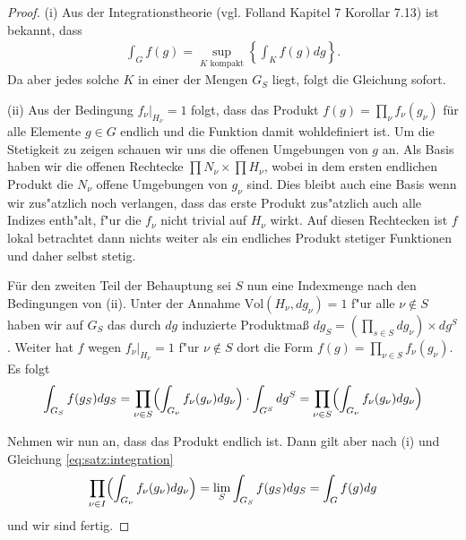 		\begin{proof}
			(i) Aus der Integrationstheorie (vgl. Folland \cite{folland} Kapitel 7 Korollar 7.13) ist bekannt, dass 
			\begin{align*}
				\int_{G} f(g) = \sup_{K \text{ kompakt}} \left\{ \int_{K} f(g)dg \right\}.
			\end{align*}
			Da aber jedes solche $K$ in einer der Mengen $G_S$ liegt, folgt die Gleichung sofort.
			
			(ii) Aus der Bedingung $f_\nu |_{H_\nu} = 1$ folgt, dass das Produkt $f(g) = \prod_{\nu}f_{\nu}(g_\nu)$ für alle Elemente $g \in G$ endlich und die Funktion damit wohldefiniert ist. 
			Um die Stetigkeit zu zeigen schauen wir uns die offenen Umgebungen von $g$ an.
			Als Basis haben wir die offenen Rechtecke $\prod N_\nu \times \prod H_\nu$, wobei in dem ersten endlichen Produkt die $N_\nu$ offene Umgebungen von $g_\nu$ sind.  
			Dies bleibt auch eine Basis wenn wir zus"atzlich noch verlangen, dass das erste Produkt zus"atzlich auch alle Indizes enth"alt, f"ur die $f_\nu$ nicht trivial auf $H_\nu$ wirkt.
			Auf diesen Rechtecken ist $f$ lokal betrachtet dann nichts weiter als ein endliches Produkt stetiger Funktionen und daher selbst stetig.
			
			Für den zweiten Teil der Behauptung sei $S$ nun eine Indexmenge nach den Bedingungen von (ii). 
			Unter der Annahme $\text{Vol}(H_\nu, dg_\nu) = 1$ f"ur alle $\nu \notin S$ haben wir auf $G_S$ das durch $dg$ induzierte Produktmaß $dg_S =\left(\prod_{s \in S}dg_\nu\right) \times dg^S$.
			Weiter hat $f$ wegen $f_\nu|_{H_\nu} = 1$ f"ur $\nu \notin S$ dort die Form $f(g) = \prod_{\nu\in S}f_\nu(g_\nu)$. 
			Es folgt
			\begin{align*}
				\int_{G_S} f(g_S) dg_S = \prod_{\nu\in S}\Bigl(\int_{G_\nu} f_\nu (g_\nu)dg_\nu\Bigr) \cdot \int_{G^S} dg^S = \prod_{\nu\in S}\Bigl(\int_{G_\nu} f_\nu (g_\nu)dg_\nu\Bigr)
			\end{align*}
			
			Nehmen wir nun an, dass das Produkt endlich ist. 
			Dann gilt aber nach (i) und Gleichung \eqref{eq:satz:integration}
			\begin{align*}
				\prod_{\nu\in I}\Bigl(\int_{G_\nu} f_\nu (g_\nu)dg_\nu\Bigr) = \lim_S \int_{G_S} f(g_S) dg_S = \int_{G} f(g) dg
			\end{align*}
			und wir sind fertig.
		\end{proof}
